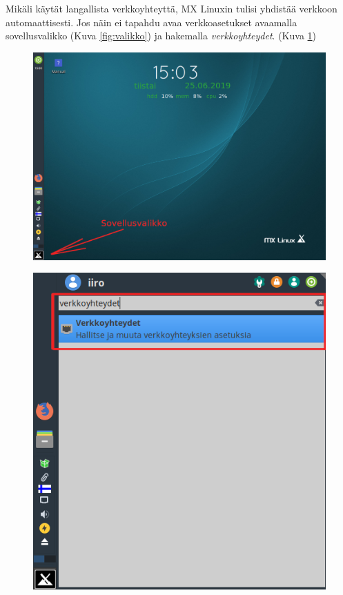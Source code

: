 \documentclass[a4paper, 12pt, finnish]{article}
\begin{document}
Mikäli käytät langallista verkkoyhteyttä, MX Linuxin tulisi yhdistää verkkoon automaattisesti. Jos näin ei tapahdu avaa verkkoasetukset avaamalla sovellusvalikko (Kuva \ref{fig:valikko}) ja hakemalla \textit{verkkoyhteydet}. (Kuva \ref{fig:verkko})
\begin{figure}[htbp]
     \centering
      \begin{minipage}{.60\textwidth}
           \centering
            \includegraphics[width=.98\linewidth]{internet/tyopoyta}
              \label{fig:valikko}
               \end{minipage}%
               \begin{minipage}{.40\textwidth}
                    \centering
                     \includegraphics[width=.98\linewidth]{internet/verkkoyhteydet}
                       \label{fig:verkko}
                        \end{minipage}
                         \end{figure}
\end{document}
